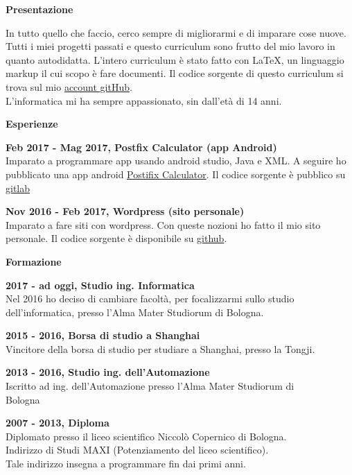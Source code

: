 \documentclass[a4paper,12pt,final]{memoir}
\newcommand{\Sep}{\vspace{1.5em}}
\newcommand{\SmallSep}{\vspace{0.5em}}
\newcommand{\CVSection}[1]
	{\Large\textbf{#1}\par
	\SmallSep\normalsize\normalfont}
\newcommand{\CVItem}[1]
	{\textbf{\color{RoyalBlue} #1}}
\begin{document}
\normalsize\normalfont

\CVSection{Presentazione}
	In tutto quello che faccio, cerco sempre di migliorarmi e di imparare cose nuove.
	Tutti i miei progetti passati e questo curriculum sono frutto del mio lavoro in quanto autodidatta.
	L'intero curriculum è stato fatto con \LaTeX, un linguaggio markup il cui scopo è fare documenti.
	Il codice sorgente di questo curriculum si trova sul mio \href{https://github.com/Mot93/CV-Mattia-Rubini}{account gitHub}.\\
	L'informatica mi ha sempre appassionato, sin dall'età di 14 anni.
\Sep


\CVSection{Esperienze}
\CVItem{Feb 2017 - Mag 2017, Postfix Calculator (app Android)}\\
	Imparato a programmare app usando android studio, Java e XML. 
	A seguire ho pubblicato una app android \href{https://play.google.com/store/apps/details?id=postfixcalculator.mattiarubini.com.postfixcalculator}{ Postifix Calculator}.
	Il codice sorgente è pubblico su \href{https://gitlab.com/mattia.rubini/PostfixCalculator}{gitlab}
\SmallSep

\CVItem{Nov 2016 - Feb 2017, Wordpress (sito personale)}\\
	Imparato a fare siti con wordpress. 
	Con queste nozioni ho fatto il mio sito personale. Il codice sorgente è disponibile su \href{https://github.com/Mot93/MattiaRubini-com-wordpress-theme}{github}.
\Sep

\CVSection{Formazione}

\CVItem{2017 - ad oggi, Studio ing. Informatica}\\
	Nel 2016 ho deciso di cambiare facoltà, per focalizzarmi sullo studio dell'informatica, presso l'Alma Mater Studiorum di Bologna.
\SmallSep

\CVItem{2015 - 2016, Borsa di studio a Shanghai}\\
	Vincitore della borsa di studio per studiare a Shanghai, presso la Tongji.
\SmallSep

\CVItem{2013 - 2016, Studio ing. dell'Automazione}\\
	Iscritto ad ing. dell'Automazione presso l'Alma Mater Studiorum di\\Bologna
\SmallSep

\CVItem{2007 - 2013, Diploma}\\
	Diplomato presso il liceo scientifico Niccolò Copernico di Bologna.\\
	Indirizzo di Studi MAXI (Potenziamento del liceo scientifico).\\
	Tale indirizzo insegna a programmare fin dai primi anni. 
\Sep
\end{document}

